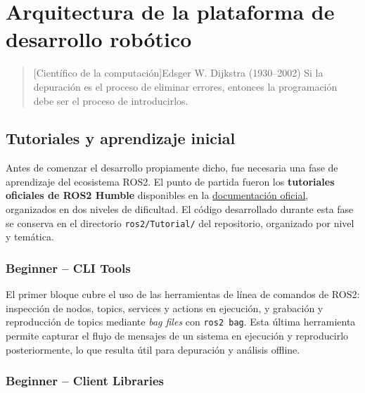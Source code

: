 \chapter{Arquitectura de la plataforma de desarrollo robótico}

\begin{quotation}[Científico de la computación]{Edsger W. Dijkstra (1930--2002)}
Si la depuración es el proceso de eliminar errores, entonces la programación debe ser el proceso de introducirlos.
\end{quotation}

\begin{abstract}
Este capítulo describe la arquitectura del sistema software desarrollado: la organización del workspace ROS2, los paquetes implementados, la configuración de Nav2 y los launch files que automatizan el proceso de experimentación.
\end{abstract}

\section{Tutoriales y aprendizaje inicial}

Antes de comenzar el desarrollo propiamente dicho, fue necesaria una fase de aprendizaje del ecosistema ROS2. El punto de partida fueron los \textbf{tutoriales oficiales de ROS2 Humble} disponibles en la \href{https://docs.ros.org/en/humble/Tutorials.html}{documentación oficial}, organizados en dos niveles de dificultad. El código desarrollado durante esta fase se conserva en el directorio \texttt{ros2/Tutorial/} del repositorio, organizado por nivel y temática.

\subsection{Beginner -- CLI Tools}

El primer bloque cubre el uso de las herramientas de línea de comandos de ROS2: inspección de nodos, topics, services y actions en ejecución, y grabación y reproducción de topics mediante \textit{bag files} con \texttt{ros2 bag}. Esta última herramienta permite capturar el flujo de mensajes de un sistema en ejecución y reproducirlo posteriormente, lo que resulta útil para depuración y análisis offline.

\subsection{Beginner -- Client Libraries}


